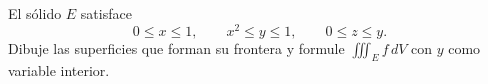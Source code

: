 El sólido $E$ satisface
\[
0\leq x\leq1,\qquad x^2\leq y\leq1,
\qquad 0\leq z\leq y.
\]
Dibuje las superficies que forman su frontera y formule $\iiint_E f\,dV$ con $y$ como variable interior.
